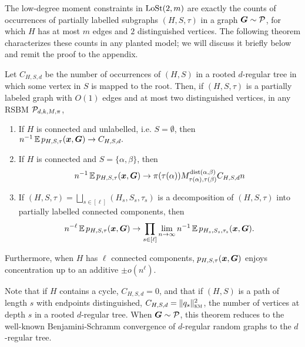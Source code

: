 The low-degree moment constraints in $\operatorname{LoSt}(2,m)$ are exactly the counts of occurrences of partially labelled subgraphs $(H,S,\tau)$ in a graph $\boldsymbol{G} \sim \mathcal{P}$, for which $H$ has at most $m$ edges and $2$ distinguished vertices. The following theorem characterizes these counts in any planted model; we will discuss it briefly below and remit the proof to the appendix.

\begin{theorem}
    Let $C_{H,S,d}$ be the number of occurrences of $(H,S)$ in a rooted $d$-regular tree in which some vertex in $S$ is mapped to the root. Then, if $(H,S,\tau)$ is a partially labeled graph with $O(1)$ edges and at most two distinguished vertices, in any RSBM $\mathcal{P}_{d,k,M,\pi}$,
    \begin{enumerate}
        \item If $H$ is connected and unlabelled, i.e. $S = \emptyset$, then $ n^{-1}\operatorname*{\mathbb{E}} p_{H,S,\tau}({\boldsymbol{x}},\boldsymbol{G})  \to C_{H,S,d}.$
        \item If $H$ is connected and $S = \{\alpha,\beta\}$, then 
        $$
            n^{-1} \operatorname*{\mathbb{E}} p_{H,S,\tau}({\boldsymbol{x}},\boldsymbol{G}) \to \pi(\tau(\alpha)) M_{\tau(\alpha),\tau(\beta)}^{\operatorname{dist}(\alpha,\beta)} C_{H,S,d} n
        $$
        \item If $(H,S,\tau) = \bigsqcup_{s \in [\ell]} (H_s,S_s,\tau_s)$ is a decomposition of $(H,S,\tau)$ into partially labelled connected components, then
        $$
            n^{-\ell} \operatorname*{\mathbb{E}} p_{H,S,\tau}({\boldsymbol{x}},\boldsymbol{G}) \to \prod_{s \in [\ell]} \lim_{n\to\infty} n^{-1} \operatorname*{\mathbb{E}} p_{H_s,S_s,\tau_s}({\boldsymbol{x}},\boldsymbol{G}).
        $$
    \end{enumerate}
    Furthermore, when $H$ has $\ell$ connected components, $p_{H,S,\tau}({\boldsymbol{x}},\boldsymbol{G})$ enjoys concentration up to an additive $\pm o(n^\ell)$.
\end{theorem}

\begin{remark}
    Note that if $H$ contains a cycle, $C_{H,S,d} = 0$, and that if $(H,S)$ is a path of length $s$ with endpoints distinguished, $C_{H,S,d} = \|q_s\|^2_{\textsc{km}}$, the number of vertices at depth $s$ in a rooted $d$-regular tree. When $\boldsymbol{G} \sim\mathcal{P}$, this theorem reduces to the well-known Benjamini-Schramm convergence of $d$-regular random graphs to the $d$-regular tree. 
\end{remark}

